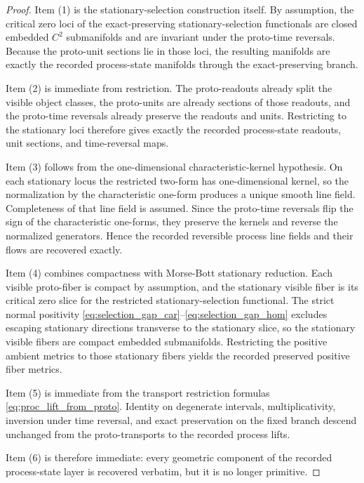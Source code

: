 \documentclass[11pt]{article}
\begin{document}
\begin{proof}
Item (1) is the stationary-selection construction itself. By assumption, the critical zero loci of the exact-preserving stationary-selection functionals are closed embedded \(C^2\) submanifolds and are invariant under the proto-time reversals. Because the proto-unit sections lie in those loci, the resulting manifolds are exactly the recorded process-state manifolds through the exact-preserving branch.

Item (2) is immediate from restriction. The proto-readouts already split the visible object classes, the proto-units are already sections of those readouts, and the proto-time reversals already preserve the readouts and units. Restricting to the stationary loci therefore gives exactly the recorded process-state readouts, unit sections, and time-reversal maps.

Item (3) follows from the one-dimensional characteristic-kernel hypothesis. On each stationary locus the restricted two-form has one-dimensional kernel, so the normalization by the characteristic one-form produces a unique smooth line field. Completeness of that line field is assumed. Since the proto-time reversals flip the sign of the characteristic one-forms, they preserve the kernels and reverse the normalized generators. Hence the recorded reversible process line fields and their flows are recovered exactly.

Item (4) combines compactness with Morse-Bott stationary reduction. Each visible proto-fiber is compact by assumption, and the stationary visible fiber is its critical zero slice for the restricted stationary-selection functional. The strict normal positivity \eqref{eq:selection_gap_car}--\eqref{eq:selection_gap_hom} excludes escaping stationary directions transverse to the stationary slice, so the stationary visible fibers are compact embedded submanifolds. Restricting the positive ambient metrics to those stationary fibers yields the recorded preserved positive fiber metrics.

Item (5) is immediate from the transport restriction formulas \eqref{eq:proc_lift_from_proto}. Identity on degenerate intervals, multiplicativity, inversion under time reversal, and exact preservation on the fixed branch descend unchanged from the proto-transports to the recorded process lifts.

Item (6) is therefore immediate: every geometric component of the recorded process-state layer is recovered verbatim, but it is no longer primitive.
\end{proof}
\end{document}
